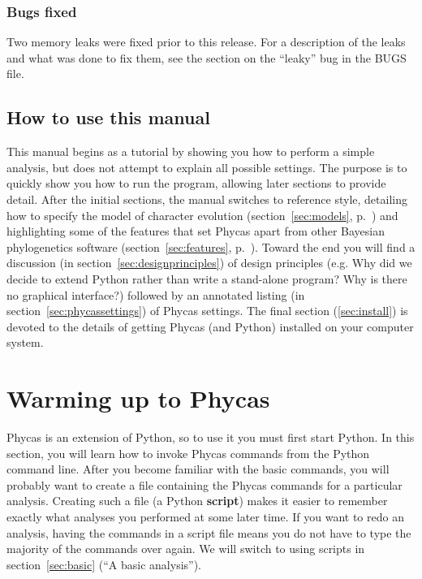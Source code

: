 \documentclass[10pt]{article}
\newcommand{\term}[1]{{\bfseries #1}\index{#1}}	%
\begin{document}
\subsubsection{Bugs fixed}
Two memory leaks were fixed prior to this release. For a description of the leaks and what was done to fix them, see the section on the ``leaky'' bug in the BUGS file.

\subsection{How to use this manual} %
This manual begins as a tutorial by showing you how to perform a simple analysis, but does not attempt to explain all possible settings. The purpose is to quickly show you how to run the program, allowing later sections to provide detail. After the initial sections, the manual switches to reference style, detailing how to specify the model of character evolution (section~\ref{sec:models}, p.~\pageref{sec:models}) and highlighting some of the features that set Phycas apart from other Bayesian phylogenetics software (section~\ref{sec:features}, p.~\pageref{sec:features}). Toward the end you will find a discussion (in section~\ref{sec:designprinciples}) of design principles (e.g. Why did we decide to extend Python rather than write a stand-alone program? Why is there no graphical interface?) followed by an annotated listing (in section~\ref{sec:phycassettings}) of Phycas settings. The final section (\ref{sec:install}) is devoted to the details of getting Phycas (and Python) installed on your computer system.

\section{Warming up to Phycas} \label{sec:warmup}

Phycas is an extension of Python, so to use it you must first start Python. In this section, you will learn how to invoke Phycas commands from the Python command line. After you become familiar with the basic commands, you will probably want to create a file containing the Phycas commands for a particular analysis. Creating such a file (a Python \term{script}) makes it easier to remember exactly what analyses you performed at some later time. If you want to redo an analysis, having the commands in a script file means you do not have to type the majority of the commands over again. We will switch to using scripts in section~\ref{sec:basic} (``A basic analysis'').
\end{document}
